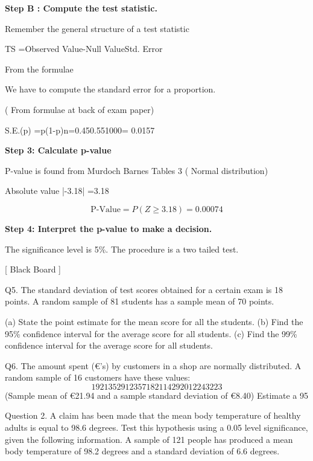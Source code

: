 



\noindent \textbf{Step B : Compute the test statistic.}

Remember the general structure of a test statistic

TS =Observed Value-Null ValueStd. Error 



From the formulae

We have to compute the standard error for a proportion. 

( From formulae at back of exam paper)

S.E.(p) =p(1-p)n=0.450.551000= 0.0157




\noindent \textbf{Step 3: Calculate p-value}

P-value is found from Murdoch Barnes Tables 3 ( Normal distribution)

Absolute value  |-3.18| =3.18




\[ \mbox{P-Value} = P(Z \geq 3.18) = 0.00074\]


\noindent \textbf{Step 4: Interpret the p-value to make a decision.}

The significance level is 5\%.  The procedure is a two tailed test.


[ Black Board ]

\newpage
Q5. The standard deviation of test scores obtained for a certain exam is 18 points. 
A random sample of 81 students has a sample mean of 70 points.

(a) State the point estimate for the mean score for all the students.
(b) Find the 95\% confidence interval for the average score for all students.
(c) Find the 99\% confidence interval for the average score for all students.

Q6. The amount spent (€’s) by customers in a shop are normally distributed. 
A random sample of 16 customers have these values:
\[19 21 35 29 12 35 7 18 21 14 29 20 12 24 32 23\]
(Sample  mean of €21.94 and a sample standard deviation of €8.40) 
Estimate a 95%




\newpage


Question 2.
A claim has been made that the mean body temperature of healthy adults is equal to 98.6 degrees. Test this hypothesis using a 0.05 level significance, given the following information.
A sample of 121 people has produced a mean body temperature of 98.2 degrees and a standard deviation of 6.6 degrees.  

